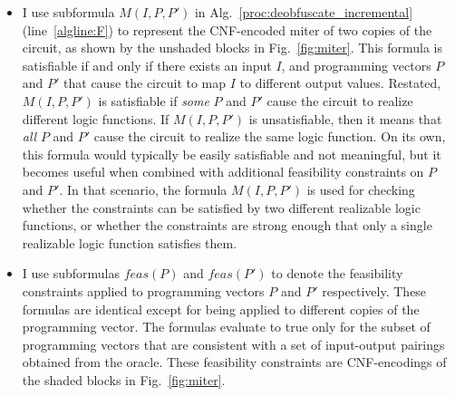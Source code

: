 \documentclass[proposal]{umassthesis}  %
\begin{document}
\begin{itemize}
\item I use subformula $M(I,P,P')$ in Alg.~\ref{proc:deobfuscate_incremental} (line~\ref{algline:F}) to represent the CNF-encoded miter of two copies of the circuit, as shown by the unshaded blocks in Fig.~\ref{fig:miter}. {This formula is satisfiable if and only if there exists an input $I$, and programming vectors $P$ and $P'$ that cause the circuit to map $I$ to different output values. Restated, $M(I,P,P')$ is satisfiable if {\itshape some} $P$ and $P'$ cause the circuit to realize different logic functions. If $M(I,P,P')$ is unsatisfiable, then it means that {\itshape all} $P$ and $P'$ cause the circuit to realize the same logic function. On its own, this formula would typically be easily satisfiable and not meaningful, but it becomes useful when combined with additional feasibility constraints on $P$ and $P'$. In that scenario, the formula $M(I,P,P')$ is used for checking whether the constraints can be satisfied by two different realizable logic functions, or whether the constraints are strong enough that only a single realizable logic function satisfies them. 
 }


\item {I use subformulas $feas(P)$ and $feas(P')$ to denote the feasibility constraints applied to programming vectors $P$ and $P'$ respectively. These formulas are identical except for being applied to different copies of the programming vector. The formulas evaluate to true only for the subset of programming vectors that are consistent with a set of input-output pairings obtained from the oracle. These feasibility constraints are CNF-encodings of the shaded blocks in Fig.~\ref{fig:miter}}. 


\end{itemize}
\end{document}
